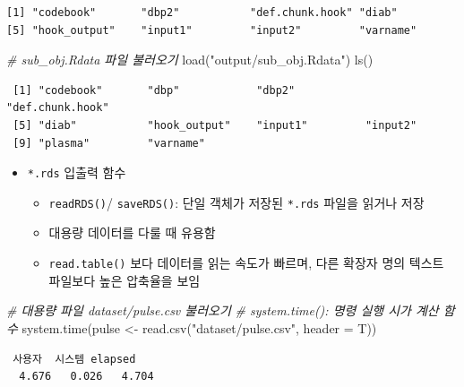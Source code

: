 \documentclass[
  11pt,
]{krantz}
\newenvironment{Shaded}{\begin{snugshade}}{\end{snugshade}}
\newcommand{\AttributeTok}[1]{\textcolor[rgb]{0.61,0.61,0.61}{#1}}
\newcommand{\CommentTok}[1]{\textcolor[rgb]{0.37,0.37,0.37}{\textit{#1}}}
\newcommand{\FunctionTok}[1]{\textcolor[rgb]{0,0,0}{#1}}
\newcommand{\NormalTok}[1]{#1}
\newcommand{\OtherTok}[1]{\textcolor[rgb]{0.37,0.37,0.37}{#1}}
\newcommand{\StringTok}[1]{\textcolor[rgb]{0.5,0.5,0.5}{#1}}
\providecommand{\tightlist}{%
  \setlength{\itemsep}{0pt}\setlength{\parskip}{0pt}}
\begin{document}
\begin{verbatim}
[1] "codebook"       "dbp2"           "def.chunk.hook" "diab"          
[5] "hook_output"    "input1"         "input2"         "varname"       
\end{verbatim}

\begin{Shaded}
\begin{Highlighting}[]
\CommentTok{\# sub\_obj.Rdata 파일 불러오기}
\FunctionTok{load}\NormalTok{(}\StringTok{"output/sub\_obj.Rdata"}\NormalTok{)}
\FunctionTok{ls}\NormalTok{()}
\end{Highlighting}
\end{Shaded}

\begin{verbatim}
 [1] "codebook"       "dbp"            "dbp2"           "def.chunk.hook"
 [5] "diab"           "hook_output"    "input1"         "input2"        
 [9] "plasma"         "varname"       
\end{verbatim}

\normalsize

\begin{itemize}
\tightlist
\item
  \texttt{*.rds} 입출력 함수

  \begin{itemize}
  \tightlist
  \item
    \texttt{readRDS()}/ \texttt{saveRDS()}: 단일 객체가 저장된 \texttt{*.rds} 파일을 읽거나 저장
  \item
    대용량 데이터를 다룰 때 유용함
  \item
    \texttt{read.table()} 보다 데이터를 읽는 속도가 빠르며, 다른 확장자 명의 텍스트 파일보다 높은 압축율을 보임
  \end{itemize}
\end{itemize}

\footnotesize

\begin{Shaded}
\begin{Highlighting}[]
\CommentTok{\# 대용량 파일 dataset/pulse.csv 불러오기}
\CommentTok{\# system.time(): 명령 실행 시가 계산 함수}
\FunctionTok{system.time}\NormalTok{(pulse }\OtherTok{\textless{}{-}} \FunctionTok{read.csv}\NormalTok{(}\StringTok{"dataset/pulse.csv"}\NormalTok{, }\AttributeTok{header =}\NormalTok{ T))}
\end{Highlighting}
\end{Shaded}

\begin{verbatim}
 사용자  시스템 elapsed 
  4.676   0.026   4.704 
\end{verbatim}
\end{document}
